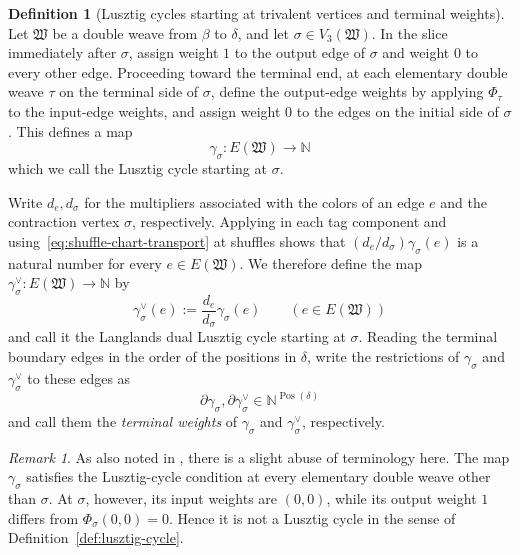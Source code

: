 \documentclass[10pt,a4paper]{article}
\theoremstyle{definition}
\newtheorem{definition}[theorem]{Definition}
\theoremstyle{remark}
\newtheorem{remark}[theorem]{Remark}
\newcommand{\fW}{\mathfrak W}
\begin{document}
\begin{definition}[Lusztig cycles starting at trivalent vertices and terminal weights]
\label{def:based-lusztig-cycle}
Let \(\fW\) be a double weave from \(\beta\) to \(\delta\), and let
\(\sigma\in V_3(\fW)\).  In the slice immediately after \(\sigma\), assign
weight \(1\) to the output edge of \(\sigma\) and weight \(0\) to every other
edge.  Proceeding toward the terminal end, at each elementary double weave
\(\tau\) on the terminal side of \(\sigma\), define the output-edge weights by
applying \(\Phi_\tau\) to the input-edge weights, and assign weight \(0\) to
the edges on the initial side of \(\sigma\).  This defines a map
\[
 \gamma_\sigma:E(\fW)\longrightarrow\mathbb N
\]
which we call the Lusztig cycle starting at \(\sigma\).

Write \(d_e,d_\sigma\) for the multipliers associated with the colors of an
edge \(e\) and the contraction vertex \(\sigma\), respectively.  Applying
\cite[Lemma~6.1]{CasalsEtAlBraidVarieties} in each tag component and
using~\eqref{eq:shuffle-chart-transport} at shuffles shows that
\((d_e/d_\sigma)\gamma_\sigma(e)\) is a natural number for every
\(e\in E(\fW)\).  We therefore define the map
\(\gamma_\sigma^\vee:E(\fW)\to\mathbb N\) by
\begin{equation}
 \gamma_\sigma^\vee(e):=\frac{d_e}{d_\sigma}\gamma_\sigma(e)
 \qquad(e\in E(\fW))
 \label{eq:dual-cycle-scaling}
\end{equation}
and call it the Langlands dual Lusztig cycle starting at \(\sigma\).  Reading
the terminal boundary edges in the order of the positions in \(\delta\), write
the restrictions of \(\gamma_\sigma\) and \(\gamma_\sigma^\vee\) to these
edges as
\[
 \partial\gamma_\sigma,
 \partial\gamma_\sigma^\vee
 \in\mathbb N^{\operatorname{Pos}(\delta)}
\]
and call them the \emph{terminal weights} of \(\gamma_\sigma\) and
\(\gamma_\sigma^\vee\), respectively.
\end{definition}

\begin{remark}
\label{rem:based-lusztig-cycle}
As also noted in \cite{CasalsEtAlBraidVarieties}, there is a slight abuse of
terminology here.  The map \(\gamma_\sigma\) satisfies the Lusztig-cycle
condition at every elementary double weave other than \(\sigma\).  At
\(\sigma\), however, its input weights are \((0,0)\), while its output weight
\(1\) differs from \(\Phi_\sigma(0,0)=0\).  Hence it is not a Lusztig cycle in
the sense of Definition~\ref{def:lusztig-cycle}.
\end{remark}
\end{document}
